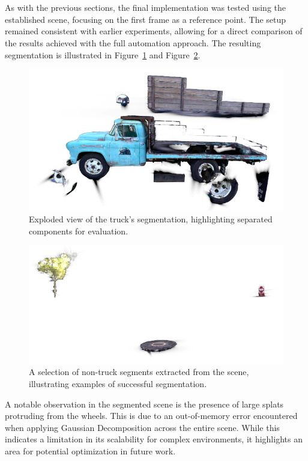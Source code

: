 \documentclass[12pt]{article}
\begin{document}
\\\\
As with the previous sections, the final implementation was tested using the established scene, focusing on the first frame as a reference point. The setup remained consistent with earlier experiments, allowing for a direct comparison of the results achieved with the full automation approach. The resulting segmentation is illustrated in Figure~\ref{fig:truckparts} and Figure~\ref{fig:best}.
\begin{figure}[h!]
	\centering
	\includegraphics[width=\textwidth]{Images/truckparts.png}
	\caption{Exploded view of the truck’s segmentation, highlighting separated components for evaluation.}
	\label{fig:truckparts}
\end{figure}
\begin{figure}[h!]
	\centering
	\includegraphics[width=\textwidth]{Images/best.png}
	\caption{A selection of non-truck segments extracted from the scene, illustrating examples of successful segmentation.}
	\label{fig:best}
\end{figure}
\FloatBarrier
\noindent
A notable observation in the segmented scene is the presence of large splats protruding from the wheels. This is due to an out-of-memory error encountered when applying Gaussian Decomposition across the entire scene. While this indicates a limitation in its scalability for complex environments, it highlights an area for potential optimization in future work.
\end{document}
